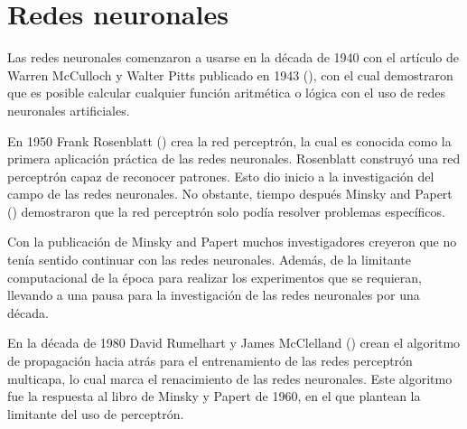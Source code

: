 \section{Redes neuronales}

Las redes neuronales comenzaron a usarse en la década de 1940 con el artículo de Warren McCulloch y Walter Pitts publicado en 1943 (\cite{mcculloch1943Logical}), con el cual demostraron que es posible calcular cualquier función aritmética o lógica con el uso de redes neuronales artificiales.

En 1950 Frank Rosenblatt (\cite{rosenblatt1958Perceptron}) crea la red perceptrón, la cual es conocida como la primera aplicación práctica de las redes neuronales. Rosenblatt construyó una red perceptrón capaz de reconocer patrones. Esto dio inicio a la investigación del campo de las redes neuronales. No obstante, tiempo después Minsky and Papert (\cite{minsky1969Perceptrons}) demostraron que la red perceptrón solo podía resolver problemas específicos.

Con la publicación de Minsky and Papert muchos investigadores creyeron que no tenía sentido continuar con las redes neuronales. Además, de la limitante computacional de la época para realizar los experimentos que se requieran, llevando a una pausa para la investigación de las redes neuronales por una década.

En la década de 1980 David Rumelhart y James McClelland (\cite{rumelhart1986Parallel}) crean el algoritmo de propagación hacia atrás para el entrenamiento de las redes perceptrón multicapa, lo cual marca el renacimiento de las redes neuronales. Este algoritmo fue la respuesta al libro de Minsky y Papert de 1960, en el que plantean la limitante del uso de perceptrón.
